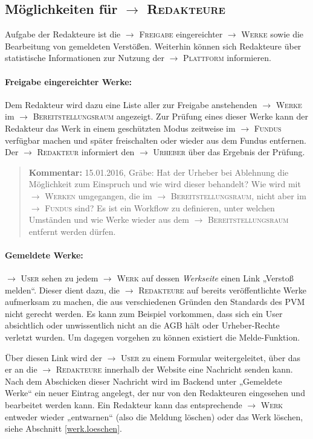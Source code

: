 \documentclass[a4paper,11pt]{article}
\newcommand{\Kommentar}[1]{
  \begin{quote}\textbf{Kommentar:} #1 \end{quote}
}
\newcommand{\glossar}[1]{{$\to$ \textsc{#1}}}
\begin{document}
\subsection{Möglichkeiten für \glossar{Redakteure}}

Aufgabe der Redakteure ist die \glossar{Freigabe} eingereichter \glossar{Werke}
sowie die Bearbeitung von gemeldeten Verstößen.  Weiterhin können sich
Redakteure über statistische Informationen zur Nutzung der \glossar{Plattform}
informieren. 

\paragraph{Freigabe eingereichter Werke:} 
Dem Redakteur wird dazu eine Liste aller zur Freigabe anstehenden
\glossar{Werke} im \glossar{Bereitstellungsraum} angezeigt.  Zur Prüfung eines
dieser Werke kann der Redakteur das Werk in einem geschützten Modus zeitweise
im \glossar{Fundus} verfügbar machen und später freischalten oder wieder aus
dem Fundus entfernen.  Der \glossar{Redakteur} informiert den \glossar{Urheber}
über das Ergebnis der Prüfung.

\Kommentar{15.01.2016, Gräbe: Hat der Urheber bei Ablehnung die Möglichkeit zum
  Einspruch und wie wird dieser behandelt? Wie wird mit \glossar{Werken}
  umgegangen, die im \glossar{Bereitstellungsraum}, nicht aber im
  \glossar{Fundus} sind? Es ist ein Workflow zu definieren, unter welchen
  Umständen und wie Werke wieder aus dem \glossar{Bereitstellungsraum} entfernt
  werden dürfen.}

\paragraph{Gemeldete Werke:} 
\glossar{User} sehen zu jedem \glossar{Werk} auf dessen \emph{Werkseite}
einen Link „Verstoß melden“.  Dieser dient dazu, die \glossar{Redakteure} auf
bereits veröffentlichte Werke aufmerksam zu machen, die aus verschiedenen
Gründen den Standards des PVM nicht gerecht werden.  Es kann zum Beispiel
vorkommen, dass sich ein User absichtlich oder unwissentlich nicht an die AGB
hält oder Urheber-Rechte verletzt wurden. Um dagegen vorgehen zu können
existiert die Melde-Funktion.

Über diesen Link wird der \glossar{User} zu einem Formular weitergeleitet, über
das er an die \glossar{Redakteure} innerhalb der Website eine Nachricht senden
kann. Nach dem Abschicken dieser Nachricht wird im Backend unter „Gemeldete
Werke“ ein neuer Eintrag angelegt, der nur von den Redakteuren eingesehen und
bearbeitet werden kann. Ein Redakteur kann das entsprechende \glossar{Werk}
entweder wieder „entwarnen“ (also die Meldung löschen) oder das Werk löschen,
siehe Abschnitt \ref{werk.loeschen}.
\end{document}

